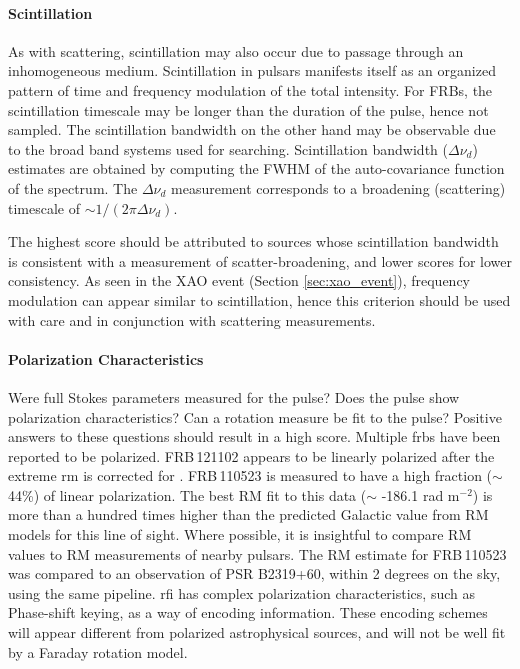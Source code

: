 \documentclass[a4paper,fleqn,usenatbib]{mnras}
\begin{document}
\paragraph{Scintillation}

As with scattering, scintillation may also occur due to passage through an
inhomogeneous medium. Scintillation in pulsars manifests itself as an organized
pattern of time and frequency modulation of the total intensity. For FRBs, the
scintillation timescale may be longer than the duration of the pulse, hence not
sampled. The scintillation bandwidth on the other hand may be observable due to
the broad band systems used for searching.  Scintillation bandwidth ($\Delta
\nu_d$) estimates are obtained by computing the FWHM of the auto-covariance
function of the spectrum.  The $\Delta \nu_d$ measurement corresponds to a
broadening (scattering) timescale of $\sim 1/(2\pi\Delta \nu_d)$.  

The highest score should be attributed to sources whose scintillation bandwidth
is consistent with a measurement of scatter-broadening, and lower scores for
lower consistency. As seen in the XAO event (Section \ref{sec:xao_event}),
frequency modulation can appear similar to scintillation, hence this criterion
should be used with care and in conjunction with scattering measurements. 

\paragraph{Polarization Characteristics}

Were full Stokes parameters measured for the pulse? Does the pulse show
polarization characteristics? Can a rotation measure be fit to the pulse?
Positive answers to these questions should result in a high score.  Multiple
\glspl{frb} have been reported to be polarized.  FRB\,121102 appears to be
linearly polarized after the extreme \gls{rm} is corrected for
\citep{2018Natur.553..182M}. FRB\,110523 is measured to have a high fraction
($\sim$ 44\%) of linear polarization. The best RM fit to this data ($\sim$
-186.1 rad m$^{-2}$) is more than a hundred times higher than the predicted
Galactic value from RM models for this line of sight. Where possible, it is
insightful to compare RM values to RM measurements of nearby pulsars. The RM
estimate for FRB\,110523 was compared to an observation of PSR B2319+60, within
2 degrees on the sky, using the same pipeline.  \gls{rfi} has complex
polarization characteristics, such as Phase-shift keying, as a way of encoding
information.  These encoding schemes will appear different from polarized
astrophysical sources, and will not be well fit by a Faraday rotation model.
\end{document}
